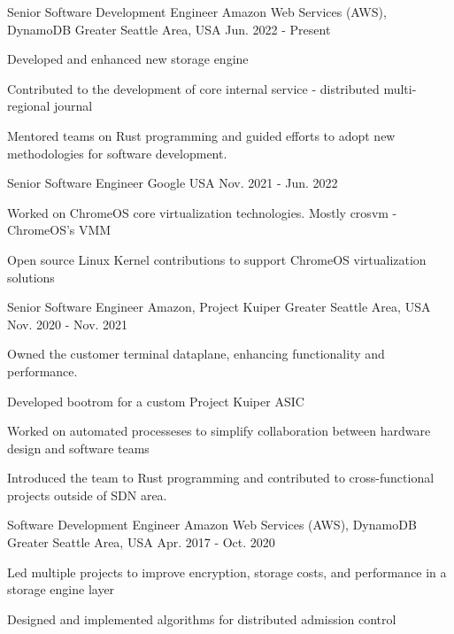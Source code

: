 \begin{cventries}
\cventry
  {Senior Software Development Engineer} %
  {Amazon Web Services (AWS), DynamoDB} %
  {Greater Seattle Area, USA} %
  {Jun. 2022 - Present} %
  {
    \begin{cvitems} %
      \item {Developed and enhanced new storage engine}
      \item {Contributed to the development of core internal service - distributed multi-regional journal}
      \item {Mentored teams on Rust programming and guided efforts to adopt new methodologies for software development.}
    \end{cvitems}
  }

\cventry
  {Senior Software Engineer} %
  {Google} %
  {USA} %
  {Nov. 2021 - Jun. 2022} %
  {
    \begin{cvitems} %
      \item {Worked on ChromeOS core virtualization technologies. Mostly crosvm - ChromeOS's VMM}
      \item {Open source Linux Kernel contributions to support ChromeOS virtualization solutions}
    \end{cvitems}
  }

\cventry
  {Senior Software Engineer} %
  {Amazon, Project Kuiper} %
  {Greater Seattle Area, USA} %
  {Nov. 2020 - Nov. 2021} %
  {
    \begin{cvitems} %
      \item {Owned the customer terminal dataplane, enhancing functionality and performance.}
      \item {Developed bootrom for a custom Project Kuiper ASIC}
      \item {Worked on automated processeses to simplify collaboration between hardware design and software teams}
      \item {Introduced the team to Rust programming and contributed to cross-functional projects outside of SDN area.}
    \end{cvitems}
  }

\cventry
  {Software Development Engineer} %
  {Amazon Web Services (AWS), DynamoDB} %
  {Greater Seattle Area, USA} %
  {Apr. 2017 - Oct. 2020} %
  {
    \begin{cvitems} %
      \item {Led multiple projects to improve encryption, storage costs, and performance in a storage engine layer}
      \item {Designed and implemented algorithms for distributed admission control}
    \end{cvitems}
  }


\end{cventries}
